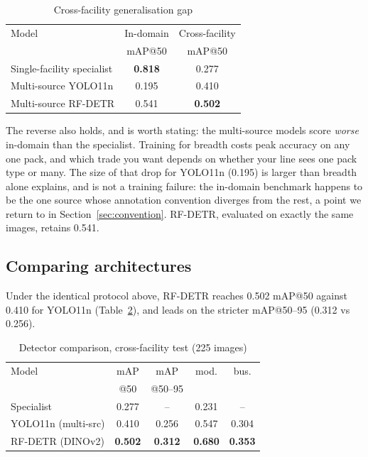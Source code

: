 \documentclass[conference]{IEEEtran}
\begin{document}
\begin{table}[t]
\caption{Cross-facility generalisation gap}
\label{tab:gap}
\centering
\small
\begin{tabular}{lcc}
\toprule
Model & In-domain & Cross-facility \\
 & mAP@50 & mAP@50 \\
\midrule
Single-facility specialist & \textbf{0.818} & 0.277 \\
Multi-source YOLO11n & 0.195 & 0.410 \\
Multi-source RF-DETR & 0.541 & \textbf{0.502} \\
\bottomrule
\end{tabular}
\end{table}

The reverse also holds, and is worth stating: the multi-source models score
\emph{worse} in-domain than the specialist. Training for breadth costs peak accuracy
on any one pack, and which trade you want depends on whether your line sees one pack
type or many. The size of that drop for YOLO11n (0.195) is larger than breadth alone
explains, and is not a training failure: the in-domain benchmark happens to be the
one source whose annotation convention diverges from the rest, a point we return to
in Section~\ref{sec:convention}. RF-DETR, evaluated on exactly the same images,
retains 0.541.

\subsection{Comparing architectures}
\label{sec:detectors}

Under the identical protocol above, RF-DETR reaches 0.502 mAP@50 against 0.410 for
YOLO11n (Table~\ref{tab:detectors}), and leads on the stricter mAP@50--95 (0.312 vs
0.256).

\begin{table}[t]
\caption{Detector comparison, cross-facility test (225 images)}
\label{tab:detectors}
\centering
\small
\begin{tabular}{lcccc}
\toprule
Model & mAP & mAP & mod. & bus. \\
 & @50 & @50--95 & & \\
\midrule
Specialist & 0.277 & -- & 0.231 & -- \\
YOLO11n (multi-src) & 0.410 & 0.256 & 0.547 & 0.304 \\
RF-DETR (DINOv2) & \textbf{0.502} & \textbf{0.312} & \textbf{0.680} & \textbf{0.353} \\
\bottomrule
\end{tabular}
\end{table}
\end{document}
